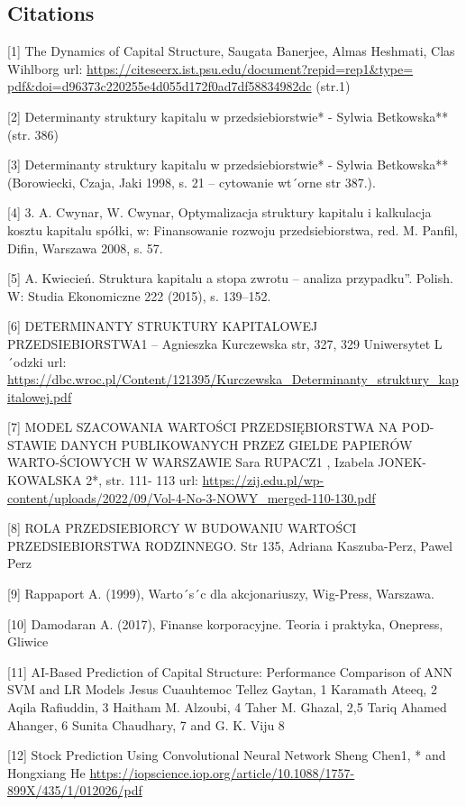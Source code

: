 \documentclass{article}
\begin{document}
\begin{flushleft}
\begin{justify}
\subsection{Citations}
[1] The Dynamics of Capital Structure, Saugata Banerjee, Almas Heshmati, Clas
Wihlborg url: \url{https://citeseerx.ist.psu.edu/document?repid=rep1&type=
pdf&doi=d96373c220255e4d055d172f0ad7df58834982dc} (str.1)

[2] Determinanty struktury kapitalu w przedsiebiorstwie* - Sylwia Betkowska**
(str. 386)

[3] Determinanty struktury kapitalu w przedsiebiorstwie* - Sylwia Betkowska**
(Borowiecki, Czaja, Jaki 1998, s. 21 – cytowanie wt´orne str 387.).

[4] 3. A. Cwynar, W. Cwynar, Optymalizacja struktury kapitalu i kalkulacja
kosztu kapitalu spółki, w: Finansowanie rozwoju przedsiebiorstwa, red. M.
Panfil, Difin, Warszawa 2008, s. 57.

[5] A. Kwiecień. Struktura kapitalu a stopa zwrotu – analiza przypadku”.
Polish. W: Studia Ekonomiczne 222 (2015), s. 139–152.

[6] DETERMINANTY STRUKTURY KAPITALOWEJ PRZEDSIEBIORSTWA1
– Agnieszka Kurczewska str, 327, 329 Uniwersytet L´odzki url: \url{https://dbc.wroc.pl/Content/121395/Kurczewska_Determinanty_struktury_kapitalowej.pdf}

[7] MODEL SZACOWANIA WARTOŚCI PRZEDSIĘBIORSTWA NA POD-
STAWIE DANYCH PUBLIKOWANYCH PRZEZ GIELDE PAPIERÓW WARTO-ŚCIOWYCH
W WARSZAWIE Sara RUPACZ1 , Izabela JONEK-KOWALSKA 2*, str. 111-
113 url: \url{https://zij.edu.pl/wp-content/uploads/2022/09/Vol-4-No-3-NOWY_merged-110-130.pdf}

[8] ROLA PRZEDSIEBIORCY W BUDOWANIU WARTOŚCI PRZEDSIEBIORSTWA
RODZINNEGO. Str 135, Adriana Kaszuba-Perz, Pawel Perz

[9] Rappaport A. (1999), Warto´s´c dla akcjonariuszy, Wig-Press, Warszawa.

[10] Damodaran A. (2017), Finanse korporacyjne. Teoria i praktyka, Onepress, Gliwice

[11] AI-Based Prediction of Capital Structure: Performance Comparison of ANN
SVM and LR Models Jesus Cuauhtemoc Tellez Gaytan, 1 Karamath Ateeq, 2 Aqila Rafiuddin, 3 Haitham M. Alzoubi, 4 Taher M. Ghazal, 2,5 Tariq Ahamed Ahanger, 6 Sunita Chaudhary, 7 and G. K. Viju 8

[12] Stock Prediction Using Convolutional Neural Network Sheng Chen1, * and
Hongxiang He \url{https://iopscience.iop.org/article/10.1088/1757-899X/435/1/012026/pdf}


\end{justify}
\end{flushleft}
\end{document}
